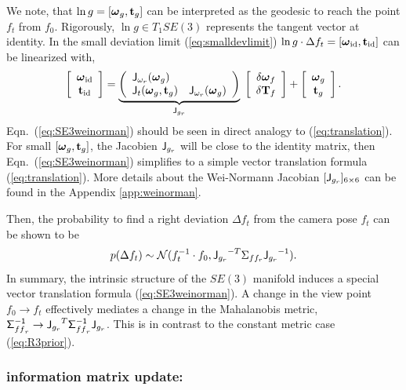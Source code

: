 \documentclass[conference]{IEEEtran}
\newcommand{\bfomega}{\boldsymbol{\omega}}
\newcommand{\sigmaff}{\mathsf{\Sigma^{-1}_\mathnormal{{ff}_r}}}
\newcommand{\Jg}{\mathsf{J_\mathnormal{g_r}}}
\newcommand{\Jom}{\mathsf{J_\mathnormal{\omega_r}}}
\newcommand{\beq}{\begin{equation}}
\newcommand{\eeq}{\end{equation}}
\begin{document}
We note, that $\ln g = [\bfomega_g,{\bf t}_g]$  can be interpreted as the geodesic
to reach the point $f_t$ from $f_0$. Rigorously, $\ln g \in T_1SE(3)$ represents the tangent vector at identity.
In the small deviation limit (\ref{eq:smalldevlimit}) $\ln g\cdot\Delta f_t = [\bfomega_{\rm id}, {\bf t}_{\rm id}] $
can be linearized with,
\beq
    \left[ \begin{array}{c}
        \bfomega_{\rm id} \\
        {\bf t}_{\rm id} 
    \end{array} \right] = 
    \underbrace{
    \left( \begin{array}{lr}
        \Jom(\bfomega_g) & \\
        {\sf J}_t(\bfomega_g,{\bf t}_g) & \Jom(\bfomega_g)
    \end{array} \right)}_{\Jg}\;
    \left[ \begin{array}{c}
        \delta\bfomega_f \\
        \delta {\bf T}_f 
    \end{array} \right] + 
    \left[ \begin{array}{c}
        \bfomega_g \\
        {\bf t}_g 
    \end{array} \right].
    \label{eq:SE3weinorman}
\eeq
Eqn.~(\ref{eq:SE3weinorman}) should be seen in direct analogy to (\ref{eq:translation}).
For small $[\bfomega_g,{\bf t}_g]$, the Jacobien $\Jg$ will be close to the identity matrix, then Eqn.~(\ref{eq:SE3weinorman})
simplifies to a simple vector translation formula (\ref{eq:translation}).
More details about the Wei-Normann Jacobian $[\Jg]_{6\times 6}$ can be found in the Appendix \ref{app:weinorman}.  

Then, the probability to find a right deviation $\Delta f_t$ from the camera pose $f_t$ can be shown to be
\beq
   p( \Delta f_t ) \sim {\cal N}( f_t^{-1} \cdot f_0, {\Jg}^{-T} \Sigma_{ff_r} {\Jg}^{-1} ).
\eeq
In summary, the intrinsic structure of the $SE(3)$ manifold induces a special vector translation formula (\ref{eq:SE3weinorman}).
A change in the view point $f_0 \rightarrow f_t$ effectively mediates a change in the Mahalanobis metric,
$\sigmaff \rightarrow  {\Jg}^{T} \sigmaff {\Jg}$. This is in contrast to the constant metric case (\ref{eq:R3prior}).

\subsubsection{information matrix update:}
\end{document}
